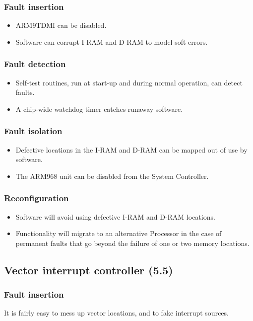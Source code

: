 \documentclass[12pt]{article}
\newenvironment{itmz}{
	\begin{itemize}
		\setlength{\itemsep}{0pt}
		\setlength{\parskip}{0pt}
	}{\end{itemize}}
\begin{document}
\subsubsection*{Fault insertion}
\begin{itmz}
\item ARM9TDMI can be disabled.
\item Software can corrupt I-RAM and D-RAM to model soft errors.
\end{itmz}
\subsubsection*{Fault detection}
\begin{itmz}
\item Self-test routines, run at start-up and during normal operation, can detect faults.
\item A chip-wide watchdog timer catches runaway software.
\end{itmz}
\subsubsection*{Fault isolation}
\begin{itmz}
\item Defective locations in the I-RAM and D-RAM can be mapped out of use by software.
\item The ARM968 unit can be disabled from the System Controller.
\end{itmz}
\subsubsection*{Reconfiguration}
\begin{itmz}
\item Software will avoid using defective I-RAM and D-RAM locations.
\item Functionality will migrate to an alternative Processor in the case of permanent faults that go
beyond the failure of one or two memory locations.
\end{itmz}

\subsection{Vector interrupt controller (5.5)}
\subsubsection*{Fault insertion}
It is fairly easy to mess up vector locations, and to fake interrupt sources.
\end{document}
